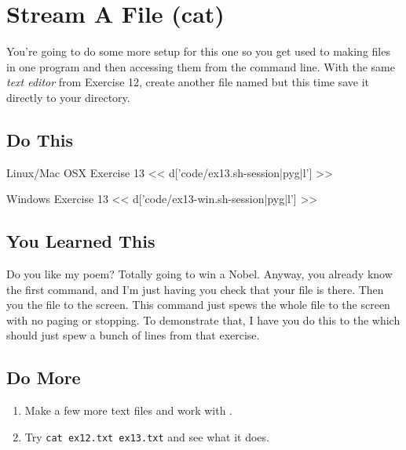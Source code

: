 \chapter{Stream A File (cat)}

You're going to do some more setup for this one so you get used to making files
in one program and then accessing them from the command line.  With the same \emph{text editor} from
Exercise 12, create another file named  but this time save
it directly to your  directory.

\section{Do This}

\begin{code}{Linux/Mac OSX Exercise 13}
<< d['code/ex13.sh-session|pyg|l'] >>
\end{code}

\begin{code}{Windows Exercise 13}
<< d['code/ex13-win.sh-session|pyg|l'] >>
\end{code}

\section{You Learned This}

Do you like my poem? Totally going to win a Nobel.  Anyway, you already know the first command, and I'm just having you check that your file is there.  Then you  the file to the screen.  This command just spews the whole file to the 
screen with no paging or stopping.  To demonstrate that, I have you do this to the
 which should just spew a bunch of lines from that exercise.

\section{Do More}

\begin{enumerate}
\item Make a few more text files and work with .
\item Try \verb|cat ex12.txt ex13.txt| and see what it does.
\end{enumerate}

